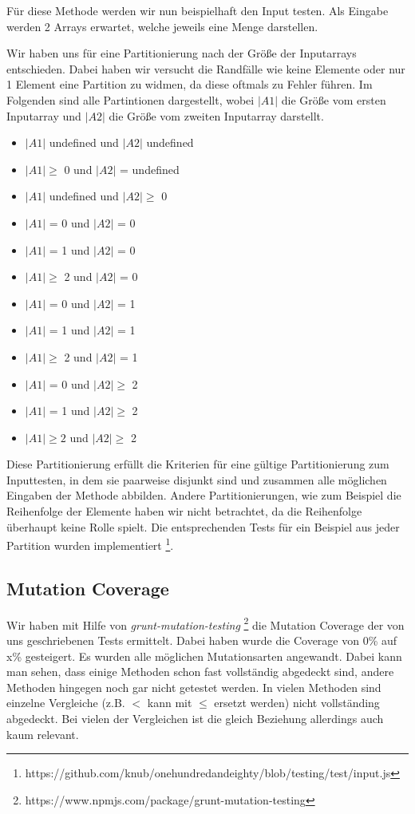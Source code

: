\documentclass[ngerman]{article}
\begin{document}
Für diese Methode werden wir nun beispielhaft den Input testen.
Als Eingabe werden 2 Arrays erwartet, welche jeweils eine Menge darstellen.

Wir haben uns für eine Partitionierung nach der Größe der Inputarrays entschieden.
Dabei haben wir versucht die Randfälle wie keine Elemente oder nur 1 Element eine Partition zu widmen, da diese oftmals zu Fehler führen.
Im Folgenden sind alle Partintionen dargestellt, wobei \emph{$|A1|$} die Größe vom ersten Inputarray und \emph{$|A2|$} die Größe vom zweiten Inputarray darstellt.
\begin{itemize}
\item $|A1|$ undefined und $|A2|$ undefined
\item $|A1| \geq$ 0 und $|A2|$ = undefined
\item $|A1|$ undefined und $|A2| \geq$ 0
\item $|A1|$ = 0 und $|A2|$ = 0
\item $|A1|$ = 1 und $|A2|$ = 0
\item $|A1| \geq$ 2 und $|A2|$ = 0
\item $|A1|$ = 0 und $|A2|$ = 1
\item $|A1|$ = 1 und $|A2|$ = 1
\item $|A1| \geq$ 2 und $|A2|$ = 1
\item $|A1|$ = 0 und $|A2| \geq$ 2
\item $|A1|$ = 1 und $|A2| \geq$  2
\item $|A1| \geq 2$ und $|A2| \geq $ 2
\end{itemize}

Diese Partitionierung erfüllt die Kriterien für eine gültige Partitionierung zum Inputtesten, in dem sie paarweise disjunkt sind und zusammen alle möglichen Eingaben der Methode abbilden.
Andere Partitionierungen, wie zum Beispiel die Reihenfolge der Elemente haben wir nicht betrachtet, da die Reihenfolge überhaupt keine Rolle spielt.
Die entsprechenden Tests für ein Beispiel aus jeder Partition wurden implementiert \footnote{https://github.com/knub/onehundredandeighty/blob/testing/test/input.js}.



\subsection{Mutation Coverage}
Wir haben mit Hilfe von \emph{grunt-mutation-testing} \footnote{https://www.npmjs.com/package/grunt-mutation-testing} die Mutation Coverage der von uns geschriebenen Tests ermittelt.
Dabei haben wurde die Coverage von 0\% auf x\% gesteigert. 
Es wurden alle möglichen Mutationsarten angewandt. Dabei kann man sehen, dass einige Methoden schon fast vollständig abgedeckt sind, andere Methoden hingegen noch gar nicht getestet werden. In vielen Methoden sind einzelne Vergleiche (z.B. $<$ kann mit $\leq$ ersetzt werden) nicht vollständing abgedeckt. Bei vielen der Vergleichen ist die gleich Beziehung allerdings auch kaum relevant.
\end{document}
